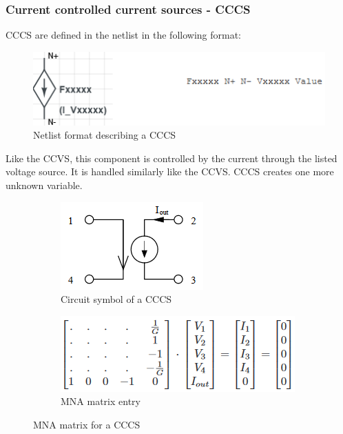 \documentclass[12pt,a4paper]{article}
\begin{document}
\subsubsection{Current controlled current sources - CCCS}
CCCS are defined in the netlist in the following format: \par
\begin{figure} [h!]
	\centering
	\includegraphics[]{F.png}
	\caption{Netlist format describing a CCCS \cite{MNA}}
\end{figure} 
Like the CCVS, this component is controlled by the current through the listed voltage source. It is handled similarly like the CCVS.
CCCS creates one more unknown variable.
\begin{figure} [h!]
	\centering
	\begin{subfigure}{.5\textwidth}
	  \centering
	  \includegraphics[scale=0.8]{F_diagram.PNG}
	  \caption{Circuit symbol of a CCCS}
	  \label{fig:sub1}
	\end{subfigure}%
	\begin{subfigure}{.5\textwidth}
	  \centering
	  \includegraphics[width= \textwidth]{F_matrices.PNG}
	  \caption{MNA matrix entry}
	  \label{fig:sub2}
	\end{subfigure}
	\caption{MNA matrix for a CCCS \cite{jahn_margraf_habchi_jacob_2003}}
	\label{fig:test}
\end{figure}


\pagebreak
\end{document}
